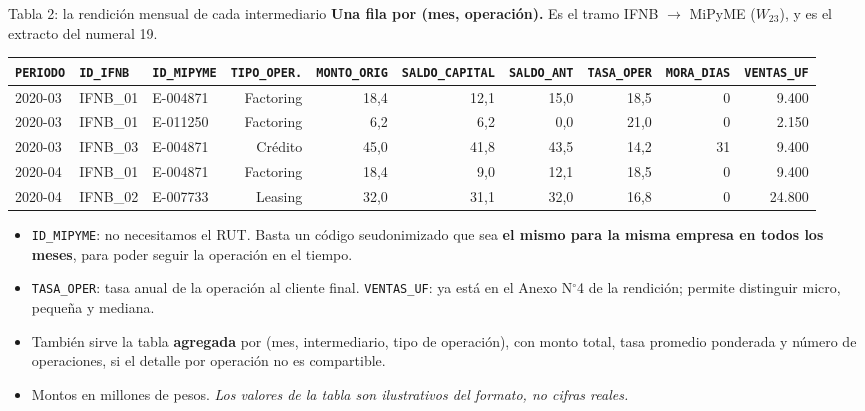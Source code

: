 \documentclass[aspectratio=169]{beamer}
\begin{document}
\begin{frame}{Tabla 2: la rendición mensual de cada intermediario}
\textbf{Una fila por (mes, operación).} Es el tramo IFNB $\to$ MiPyME ($W_{23}$), y es el extracto del numeral 19.

\vspace{0.25cm}
\begin{table}
\centering
\tiny
\begin{tabular}{@{}lllrrrrrrr@{}}
\toprule
\texttt{PERIODO} & \texttt{ID\_IFNB} & \texttt{ID\_MIPYME} & \texttt{TIPO\_OPER.} & \texttt{MONTO\_ORIG} & \texttt{SALDO\_CAPITAL} & \texttt{SALDO\_ANT} & \texttt{TASA\_OPER} & \texttt{MORA\_DIAS} & \texttt{VENTAS\_UF} \\
\midrule
2020-03 & IFNB\_01 & E-004871 & Factoring & 18,4 & 12,1 & 15,0 & 18,5 &  0 &  9.400 \\
2020-03 & IFNB\_01 & E-011250 & Factoring &  6,2 &  6,2 &  0,0 & 21,0 &  0 &  2.150 \\
2020-03 & IFNB\_03 & E-004871 & Crédito   & 45,0 & 41,8 & 43,5 & 14,2 & 31 &  9.400 \\
2020-04 & IFNB\_01 & E-004871 & Factoring & 18,4 &  9,0 & 12,1 & 18,5 &  0 &  9.400 \\
2020-04 & IFNB\_02 & E-007733 & Leasing   & 32,0 & 31,1 & 32,0 & 16,8 &  0 & 24.800 \\
\bottomrule
\end{tabular}
\end{table}

\vspace{0.1cm}
\begin{itemize}\footnotesize
    \item \texttt{ID\_MIPYME}: \alert{no necesitamos el RUT}. Basta un código seudonimizado que sea \textbf{el mismo para la misma empresa en todos los meses}, para poder seguir la operación en el tiempo.
    \item \texttt{TASA\_OPER}: tasa anual de la operación al cliente final. \texttt{VENTAS\_UF}: ya está en el Anexo N$^\circ$4 de la rendición; permite distinguir micro, pequeña y mediana.
    \item También sirve la tabla \textbf{agregada} por (mes, intermediario, tipo de operación), con monto total, tasa promedio ponderada y número de operaciones, si el detalle por operación no es compartible.
    \item Montos en millones de pesos. \emph{Los valores de la tabla son ilustrativos del formato, no cifras reales.}
\end{itemize}
\end{frame}
\end{document}
